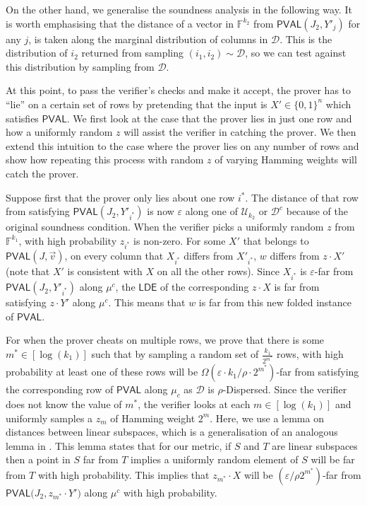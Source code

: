 \documentclass[11pt]{article}
\newcommand{\PVAL}{\mathsf{PVAL}}
\newcommand{\LDE}{\mathsf{LDE}}
\newcommand{\sD}{\mathcal{D}}
\begin{document}
On the other hand, we generalise the soundness analysis in the following way. It is worth emphasising that the distance of a vector in $\mathbb{F}^{k_{2}}$ from $\PVAL(J_2,Y'_j)$ for any $j$, is taken along the marginal distribution of columns in $\mathcal{D}$. This is the distribution of $i_{2}$ returned from sampling $(i_{1}, i_{2})\sim \mathcal{D}$, so we can test against this distribution by sampling from $\mathcal{D}$.

At this point, to pass the verifier's checks and make it accept, the prover has to ``lie'' on a certain set of rows by pretending that the input is 
$X'\in \{0,1\}^{n}$ which satisfies $\PVAL$. We first look at the case that the prover lies in just one row and how a uniformly random $z$ will assist the verifier in catching the prover. We then extend this intuition to the case where the prover lies on any number of rows and show how repeating this process with random $z$ of varying Hamming weights will catch the prover.

Suppose first that the prover only lies about one row $i^{\ast}$. The distance of that row from satisfying $\PVAL(J_2,Y'_{i^\ast})$ is now $\varepsilon$ along one of $\mathcal{U}_{k_{2}}$ or $\mathcal{D}^{c}$ because of the original soundness condition. When the verifier picks a uniformly random $z$ from $\mathbb{F}^{k_{1}}$, with high probability $z_{i^{\ast}}$ is non-zero. For some $X'$ that belongs to $\PVAL(J,\vec{v})$, on every column that $X_{i^{\ast}}$ differs from $X'_{i^{\ast}}$, $w$ differs from $z \cdot X'$ (note that $X'$ is consistent with $X$ on all the other rows). Since $X_{i^{\ast}}$ is $\varepsilon$-far from $\PVAL({J_2,Y'_{i^\ast}})$ along $\mu^{c}$, the $\LDE$ of the corresponding $z \cdot X$ is far from satisfying $z\cdot Y'$  along $\mu^{c}$. This means that $w$ is far from this new folded instance of $\PVAL$.

For when the prover cheats on multiple rows, we prove that there is some $m^{\ast}\in [\log (k_{1})]$ such that by sampling a random set of $\frac{k_{1}}{2^{m^*}}$ rows, with high probability at least one of these rows will be $\Omega(\varepsilon\cdot k_{1}/\rho \cdot 2^{m^{\ast}})$-far from satisfying the corresponding row of $\PVAL$ along $\mu_{c}$ as $\sD$ is $\rho$-Dispersed. Since the verifier does not know the value of $m^{\ast}$, the verifier looks at each $m\in [\log (k_{1})]$ and uniformly samples a $z_{m}$ of Hamming weight $2^{m}$. Here, we use a lemma on distances between linear subspaces, which is a generalisation of an analogous lemma in \cite{RVW}. This lemma states that for our metric, if $S$ and $T$ are linear subspaces then a point in $S$ far from $T$ implies a uniformly random element of $S$ will be far from $T$ with high probability. This implies that $z_{m^{\ast}}\cdot X$ will be $(\varepsilon/\rho 2^{m^{\ast}})$-far from $\PVAL\bigg(J_{2}, z_{m^{\ast}}\cdot Y'\bigg)$ along $\mu^{c}$ with high probability. 
\end{document}
